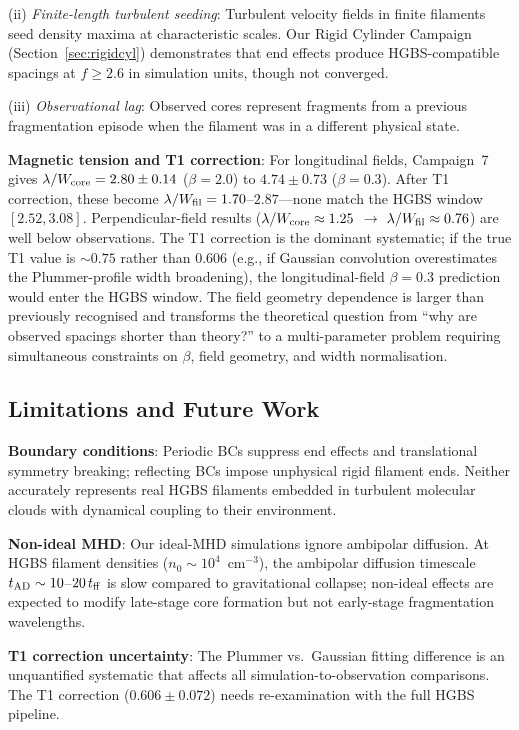 \documentclass[twoside,twocolumn]{mnras}
\begin{document}
(ii) \textit{Finite-length turbulent seeding}: Turbulent velocity fields in finite
filaments seed density maxima at characteristic scales. Our Rigid Cylinder Campaign
(Section~\ref{sec:rigidcyl}) demonstrates that end effects produce HGBS-compatible spacings
at $f \geq 2.6$ in simulation units, though not converged.

(iii) \textit{Observational lag}: Observed cores represent fragments from a previous
fragmentation episode when the filament was in a different physical state.

\textbf{Magnetic tension and T1 correction}: For longitudinal fields, Campaign~7 gives
$\lambda/W_{\rm core} = 2.80 \pm 0.14$ ($\beta = 2.0$) to $4.74 \pm 0.73$ ($\beta = 0.3$).
After T1 correction, these become $\lambda/W_{\rm fil} = 1.70$--$2.87$---none match the
HGBS window $[2.52, 3.08]$. Perpendicular-field results ($\lambda/W_{\rm core} \approx 1.25$
$\to$ $\lambda/W_{\rm fil} \approx 0.76$) are well below observations. The T1 correction
is the dominant systematic; if the true T1 value is ${\sim}0.75$ rather than 0.606
(e.g., if Gaussian convolution overestimates the Plummer-profile width broadening),
the longitudinal-field $\beta = 0.3$ prediction would enter the HGBS window. The
field geometry dependence is larger than previously recognised and transforms the
theoretical question from ``why are observed spacings shorter than theory?'' to a
multi-parameter problem requiring simultaneous constraints on $\beta$, field geometry,
and width normalisation.

\subsection{Limitations and Future Work}

\textbf{Boundary conditions}: Periodic BCs suppress end effects and translational
symmetry breaking; reflecting BCs impose unphysical rigid filament ends. Neither
accurately represents real HGBS filaments embedded in turbulent molecular clouds with
dynamical coupling to their environment.

\textbf{Non-ideal MHD}: Our ideal-MHD simulations ignore ambipolar diffusion. At HGBS
filament densities ($n_0 \sim 10^4$~cm$^{-3}$), the ambipolar diffusion timescale
$t_{\rm AD} \sim 10$--$20\,t_{\rm ff}$ is slow compared to gravitational collapse;
non-ideal effects are expected to modify late-stage core formation but not early-stage
fragmentation wavelengths.

\textbf{T1 correction uncertainty}: The Plummer vs.\ Gaussian fitting difference is an
unquantified systematic that affects all simulation-to-observation comparisons. The
T1 correction ($0.606 \pm 0.072$) needs re-examination with the full HGBS pipeline.
\end{document}
